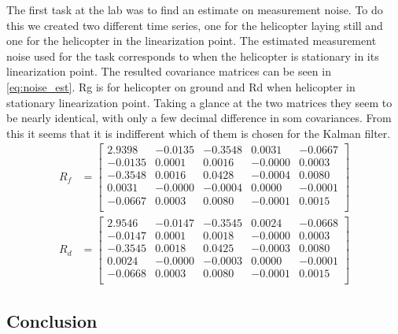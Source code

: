 The first task at the lab was to find an estimate on measurement noise. To do this we 
created two different time series, one for the helicopter laying still and one for the helicopter in the linearization point.
The estimated measurement noise used for the task corresponds to when the helicopter is stationary in its linearization point.
The resulted covariance matrices can be seen in \ref{eq:noise_est}. Rg is for helicopter on ground and Rd when helicopter in stationary linearization point.
Taking a glance at the two matrices they seem to be nearly identical, with only a few decimal difference in som covariances. 
From this it seems that it is indifferent which of them is chosen for the Kalman filter.
\begin{subequations}\label{eq:noise_est}
    \begin{align}
    R_f &=  \begin{bmatrix}
    2.9398 & -0.0135 & -0.3548 & 0.0031 & -0.0667\\
    -0.0135 &   0.0001  &  0.0016  & -0.0000  &  0.0003\\
   -0.3548  &  0.0016  &  0.0428  & -0.0004  &  0.0080\\
    0.0031  & -0.0000 &  -0.0004 &   0.0000  & -0.0001\\
   -0.0667  &  0.0003  &  0.0080 &  -0.0001  &  0.0015\\
    \end{bmatrix}\label{eq:Rg}\\
    R_d &= \begin{bmatrix}
        2.9546  & -0.0147  & -0.3545  &  0.0024   &-0.0668\\
        -0.0147 &   0.0001 &   0.0018 &  -0.0000  &  0.0003\\
        -0.3545 &   0.0018  &  0.0425 &  -0.0003  &  0.0080\\
         0.0024 &  -0.0000  & -0.0003 &   0.0000  & -0.0001\\
        -0.0668 &   0.0003  &  0.0080 &  -0.0001  &  0.0015\\
    \end{bmatrix}\label{eq:Rd}
    \end{align}
\end{subequations}



\subsection{Conclusion}
